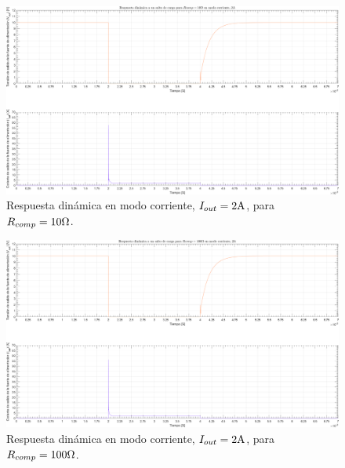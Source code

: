\clearpage

\begin{figure}[H] %
\begin{center}
\includegraphics[width=1.1 \textwidth, angle=90]{./img/plots/dynamic/power_supply_RCOMP_10_STEP_Modo3.png}
\caption{\label{fig:fig_power_supply_RCOMP_STEP_10_Modo3}\footnotesize{Respuesta dinámica en modo corriente, $I_{out} = 2 \si[per-mode=symbol]{\ampere}$, para $R_{comp} = 10 \si[per-mode=symbol]{\ohm} $.}}
\end{center}
\end{figure}

\clearpage

\begin{figure}[H] %
\begin{center}
\includegraphics[width=1.1 \textwidth, angle=90]{./img/plots/dynamic/power_supply_RCOMP_100_STEP_Modo3.png}
\caption{\label{fig:fig_power_supply_RCOMP_STEP_100_Modo3}\footnotesize{Respuesta dinámica en modo corriente, $I_{out} = 2 \si[per-mode=symbol]{\ampere}$, para $R_{comp} = 100 \si[per-mode=symbol]{\ohm} $.}}
\end{center}
\end{figure}


